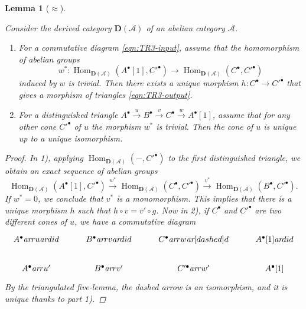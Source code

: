 \documentclass[leqno,12pt]{article}
\theoremstyle{plain}
\newtheorem{lemma}[theorem]{\indent\sc Lemma}
\theoremstyle{definition}
\DeclareMathOperator{\Hom}{Hom}
\newcommand{\ar}{\text{\it ar}}
\begin{document}
\begin{lemma}[{$\approx$\cite[Proposition~1.1.9, Corollaire~1.1.10]{Beilinson-Bernstein-Deligne}}]
  \label{lemma:TR3-TR1-with-uniqueness-general-statement}

  Consider the derived category $\mathbf{D} (\mathcal{A})$ of an abelian
  category $\mathcal{A}$.

  \begin{enumerate}
  \item[$1)$] For a commutative diagram \eqref{eqn:TR3-input}, assume that the
    homomorphism of abelian groups
    \[ w^*\colon \Hom_{\mathbf{D} (\mathcal{A})} (A^\bullet [1], C'^\bullet) \to
      \Hom_{\mathbf{D} (\mathcal{A})} (C^\bullet, C'^\bullet) \]
    induced by $w$ is trivial. Then there exists a unique morphism
    $h\colon C^\bullet \to C'^\bullet$ that gives a morphism of triangles
    \eqref{eqn:TR3-output}.

  \item[$2)$] For a distinguished triangle
    $A^\bullet \xrightarrow{u} B^\bullet \xrightarrow{v} C^\bullet \xrightarrow{w} A^\bullet[1]$,
    assume that for any other cone $C'^\bullet$ of $u$ the morphism $w^*$ is
    trivial. Then the cone of $u$ is unique up to a unique isomorphism.
  \end{enumerate}

  \begin{proof}
    In 1), applying $\Hom_{\mathbf{D} (\mathcal{A})} (-, C'^\bullet)$ to the
    first distinguished triangle, we obtain an exact sequence of abelian groups
    \[ \Hom_{\mathbf{D} (\mathcal{A})} (A^\bullet [1], C'^\bullet) \xrightarrow{w^*}
      \Hom_{\mathbf{D} (\mathcal{A})} (C^\bullet, C'^\bullet) \xrightarrow{v^*}
      \Hom_{\mathbf{D} (\mathcal{A})} (B^\bullet, C'^\bullet). \]
    If $w^* = 0$, we conclude that $v^*$ is a monomorphism. This implies that
    there is a unique morphism $h$ such that $h\circ v = v'\circ g$. Now in 2),
    if $C^\bullet$ and $C'^\bullet$ are two different cones of $u$, we have a
    commutative diagram
    \[ \begin{tikzcd}
        A^\bullet\ar{r}{u}\ar{d}{id} & B^\bullet\ar{r}{v}\ar{d}{id} & C^\bullet\ar{r}{w}\ar[dashed]{d} & A^\bullet [1]\ar{d}{id} \\
        A^\bullet\ar{r}{u'} & B^\bullet\ar{r}{v'} & C'^\bullet\ar{r}{w'} & A^\bullet [1]
      \end{tikzcd} \]
    By the triangulated five-lemma, the dashed arrow is an isomorphism, and it
    is unique thanks to part 1).
  \end{proof}
\end{lemma}
\end{document}
